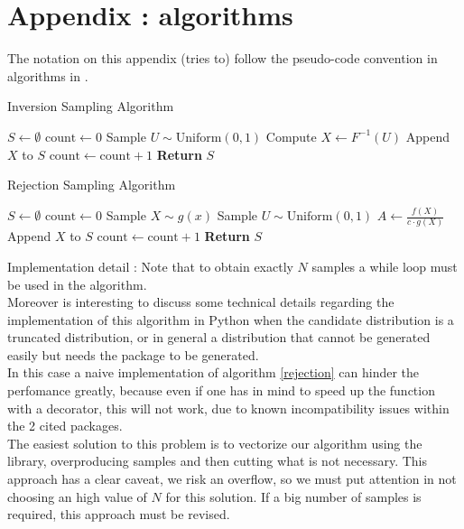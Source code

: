 \chapter*{Appendix : algorithms}

The notation on this appendix (tries to) follow the pseudo-code convention in algorithms in \cite{knuth97}.

\begin{algorithm}
    \caption{Inversion Sampling Algorithm}
    \begin{algorithmic}[1]
    \State \( S \leftarrow \emptyset \)
    \State \( \text{count} \leftarrow 0 \)
        \State Sample \( U \sim \text{Uniform}(0, 1) \) 
        \State Compute \( X \leftarrow F^{-1}(U) \) 
        \State Append \( X \) to \( S \)
        \State \( \text{count} \leftarrow \text{count} + 1 \)
    \EndWhile
    \State \textbf{Return} \( S \)
    \end{algorithmic}
    \label{inversion}
\end{algorithm}


\begin{algorithm}
    \caption{Rejection Sampling Algorithm}
    \begin{algorithmic}[1]
    \State \( S \leftarrow \emptyset \)
    \State \( \text{count} \leftarrow 0 \)
        \State Sample \( X \sim g(x) \) 
        \State Sample \( U \sim \text{Uniform}(0, 1) \) 
        \State \( A \leftarrow \frac{f(X)}{c \cdot g(X)} \) 
            \State Append \( X \) to \( S \)
            \State \( \text{count} \leftarrow \text{count} + 1 \)
        \EndIf
    \EndWhile
    \State \textbf{Return} \( S \)
    \end{algorithmic}
    \label{rejection}
    \end{algorithm}
    
\label{par:detail_rejection}  
Implementation detail : Note that to obtain exactly $N$ samples a while loop must be used in the algorithm. \\
Moreover is interesting to discuss some technical details regarding the implementation of this algorithm in Python when the candidate
distribution is a truncated distribution, or in general a distribution that cannot be generated easily but needs the  package
to be generated.\\
In this case a naive implementation of algorithm \ref{rejection} can hinder the perfomance greatly, because even if one has in mind to speed
up the function with a  decorator, this will not work, due to known incompatibility issues within the 2 cited packages. \\
The easiest solution to this problem is to vectorize our algorithm using the  library, overproducing samples 
and then cutting what is not necessary. This approach has a clear caveat, we risk an  overflow, so we must put attention
in not choosing an high value of $N$ for this solution. If a big number of samples is required, this approach must be revised.

